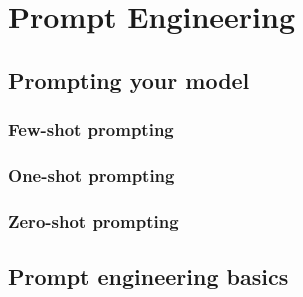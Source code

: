 \chapter{Prompt Engineering}

\section{Prompting your model}
\subsection{Few-shot prompting}
\subsection{One-shot prompting}
\subsection{Zero-shot prompting}

\section{Prompt engineering basics}
